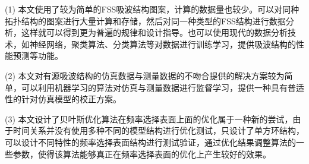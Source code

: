 (1) 本文使用了较为简单的FSS吸波结构图案，计算的数据量也较少。可以对同种拓扑结构的图案进行大量计算和存储，然后对同一种类型的FSS结构进行数据分析，这样就可以得到更为普遍的规律和设计指导。也可以使用现代的数据分析技术，如神经网络，聚类算法、分类算法等对数据进行训练学习，提供吸波结构的性能预测等功能。

(2) 本文对有源吸波结构的仿真数据与测量数据的不吻合提供的解决方案较为简单，可以利用机器学习的算法对仿真与测量数据进行监督学习，提供一种具有普适性的针对仿真模型的校正方案。

(3) 本文设计了贝叶斯优化算法在频率选择表面上面的优化属于一种新的尝试，由于时间关系并没有使用多种不同的模型结构进行优化测试，只设计了单方环结构，可以设计不同特性的频率选择表面结构进行测试验证，通过优化结果调整算法的一些参数，使得该算法能够真正在频率选择表面的优化上产生较好的效果。

